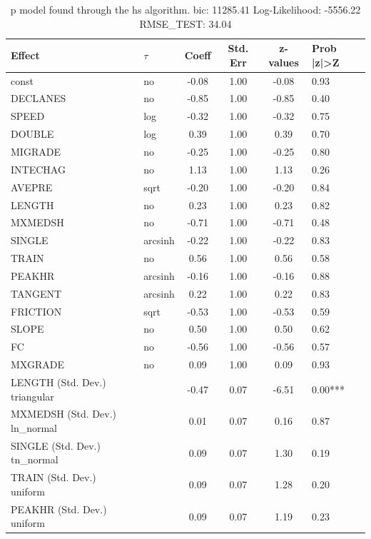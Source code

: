 \begin{table}
	\caption{p model found through the hs algorithm. bic: 11285.41 Log-Likelihood: -5556.22 RMSE_TEST: 34.04}
	\begin{center}
		\begin{tabular}{|l|l|c|c|c|l|}
			\hline
			Effect & $\tau$ & Coeff & Std. Err & z-values & Prob |z|>Z \\
			\hline
			const & no & -0.08 & 1.00 & -0.08 & 0.93 \\
			\hline
			DECLANES & no & -0.85 & 1.00 & -0.85 & 0.40 \\
			\hline
			SPEED & log & -0.32 & 1.00 & -0.32 & 0.75 \\
			\hline
			DOUBLE & log & 0.39 & 1.00 & 0.39 & 0.70 \\
			\hline
			MIGRADE & no & -0.25 & 1.00 & -0.25 & 0.80 \\
			\hline
			INTECHAG & no & 1.13 & 1.00 & 1.13 & 0.26 \\
			\hline
			AVEPRE & sqrt & -0.20 & 1.00 & -0.20 & 0.84 \\
			\hline
			LENGTH & no & 0.23 & 1.00 & 0.23 & 0.82 \\
			\hline
			MXMEDSH & no & -0.71 & 1.00 & -0.71 & 0.48 \\
			\hline
			SINGLE & arcsinh & -0.22 & 1.00 & -0.22 & 0.83 \\
			\hline
			TRAIN & no & 0.56 & 1.00 & 0.56 & 0.58 \\
			\hline
			PEAKHR & arcsinh & -0.16 & 1.00 & -0.16 & 0.88 \\
			\hline
			TANGENT & arcsinh & 0.22 & 1.00 & 0.22 & 0.83 \\
			\hline
			FRICTION & sqrt & -0.53 & 1.00 & -0.53 & 0.59 \\
			\hline
			SLOPE & no & 0.50 & 1.00 & 0.50 & 0.62 \\
			\hline
			FC & no & -0.56 & 1.00 & -0.56 & 0.57 \\
			\hline
			MXGRADE & no & 0.09 & 1.00 & 0.09 & 0.93 \\
			\hline
			LENGTH (Std. Dev.) triangular &  & -0.47 & 0.07 & -6.51 & 0.00*** \\
			\hline
			MXMEDSH (Std. Dev.) ln_normal &  & 0.01 & 0.07 & 0.16 & 0.87 \\
			\hline
			SINGLE (Std. Dev.) tn_normal &  & 0.09 & 0.07 & 1.30 & 0.19 \\
			\hline
			TRAIN (Std. Dev.) uniform &  & 0.09 & 0.07 & 1.28 & 0.20 \\
			\hline
			PEAKHR (Std. Dev.) uniform &  & 0.09 & 0.07 & 1.19 & 0.23 \\

\end{tabular}
\end{center}
\end{table}
